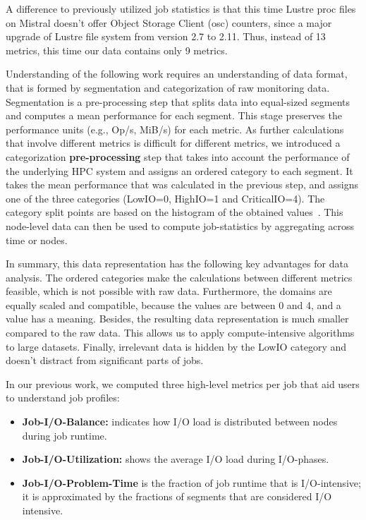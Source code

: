\documentclass[]{llncs}
\begin{document}
A difference to previously utilized job statistics is that this time Lustre proc files on Mistral doesn't offer Object Storage Client (osc) counters, since a major upgrade of Lustre file system from version 2.7 to 2.11.
Thus, instead of 13 metrics, this time our data contains only 9 metrics.

Understanding of the following work requires an understanding of data format, that is formed by segmentation and categorization of raw monitoring data.
Segmentation is a pre-processing step that splits data into equal-sized segments and computes a mean performance for each segment.
This stage preserves the performance units (e.g., Op/s, MiB/s) for each metric.
As further calculations that involve different metrics is difficult for different metrics, we introduced a categorization\textbf{ pre-processing} step that takes into account the performance of the underlying HPC system and assigns an ordered category to each segment.
It takes the mean performance that was calculated in the previous step, and assigns one of the three categories (LowIO=0, HighIO=1 and CriticalIO=4).
The category split points are based on the histogram of the obtained values~\cite{iocats2020}.
This node-level data can then be used to compute job-statistics by aggregating across time or nodes.

In summary, this data representation has the following key advantages for data analysis.
The ordered categories make the calculations between different metrics feasible, which is not possible with raw data.
Furthermore, the domains are equally scaled and compatible, because the values are between 0 and 4, and a value has a meaning.
Besides, the resulting data representation is much smaller compared to the raw data.
This allows us to apply compute-intensive algorithms to large datasets.
Finally, irrelevant data is hidden by the LowIO category and doesn't distract from significant parts of jobs.

In our previous work, we computed three high-level metrics per job that aid users to understand job profiles: 

\begin{itemize}
	\item \textbf{Job-I/O-Balance:} indicates how I/O load is distributed between nodes during job runtime.
	\item \textbf{Job-I/O-Utilization:} shows the average I/O load during I/O-phases.
	\item \textbf{Job-I/O-Problem-Time} is the fraction of job runtime that is I/O-intensive; it is approximated by the fractions of segments that are considered I/O intensive.
\end{itemize}
\end{document}
